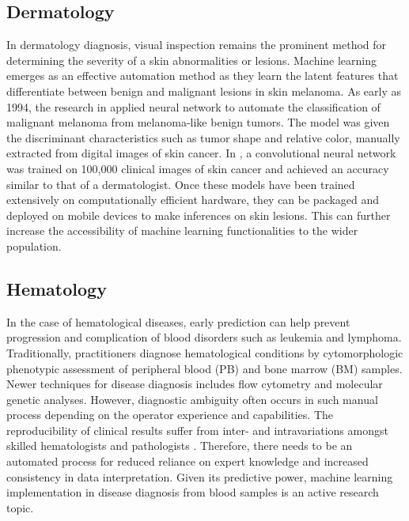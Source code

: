 \documentclass[a4paper]{article}
\begin{document}
\subsection{Dermatology}
In dermatology diagnosis, visual inspection remains the prominent method for determining the severity of a skin abnormalities or lesions. 
Machine learning emerges as an effective automation method as they learn the latent features that differentiate between benign and malignant lesions in skin melanoma. 
As early as 1994, the research in \cite{ercal_neural_1994} applied neural network to automate the classification of malignant melanoma from melanoma-like benign tumors.
The model was given the discriminant characteristics such as tumor shape and relative color, manually extracted from digital images of skin cancer.
In \cite{esteva_dermatologist-level_2017}, a convolutional neural network was trained on 100,000 clinical images of skin cancer and achieved an accuracy similar to that of a dermatologist.
Once these models have been trained extensively on computationally efficient hardware, they can be packaged and deployed on mobile devices to make inferences on skin lesions. 
This can further increase the accessibility of machine learning functionalities to the wider population.


\subsection{Hematology}
In the case of hematological diseases, early prediction can help prevent progression and complication of blood disorders such as leukemia and lymphoma. 
Traditionally, practitioners diagnose hematological conditions by cytomorphologic phenotypic assessment of peripheral blood (PB) and bone marrow (BM) samples.
Newer techniques for disease diagnosis includes flow cytometry and molecular genetic analyses. 
However, diagnostic ambiguity often occurs in such manual process depending on the operator experience and capabilities. 
The reproducibility of clinical results suffer from inter- and intravariations amongst skilled hematologists and pathologists \cite{walter_artificial_2023,wu_hematologist-level_2020}.
Therefore, there needs to be an automated process for reduced reliance on expert knowledge and increased consistency in data interpretation.
Given its predictive power, machine learning implementation in disease diagnosis from blood samples is an active research topic.
\end{document}
